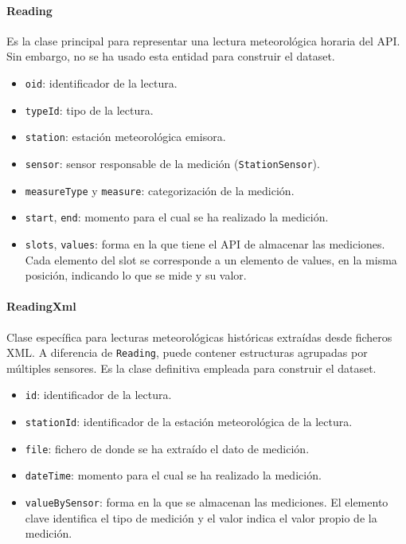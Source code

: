 \vspace{1em}
\paragraph{Reading}
Es la clase principal para representar una lectura meteorológica horaria del API. Sin embargo, no se ha usado esta entidad para construir el dataset.
\begin{itemize}
	\item \texttt{oid}: identificador de la lectura.
	\item \texttt{typeId}: tipo de la lectura.
	\item \texttt{station}: estación meteorológica emisora.
	\item \texttt{sensor}: sensor responsable de la medición (\texttt{StationSensor}).
	\item \texttt{measureType} y \texttt{measure}: categorización de la medición.
	\item \texttt{start}, \texttt{end}: momento para el cual se ha realizado la medición.
	\item \texttt{slots}, \texttt{values}: forma en la que tiene el API de almacenar las mediciones. Cada elemento del slot se corresponde a un elemento de values, en la misma posición, indicando lo que se mide y su valor.
\end{itemize}

\paragraph{ReadingXml}
Clase específica para lecturas meteorológicas históricas extraídas desde ficheros XML. A diferencia de \texttt{Reading}, puede contener estructuras agrupadas por múltiples sensores. Es la clase definitiva empleada para construir el dataset.
\begin{itemize}
	\item \texttt{id}: identificador de la lectura.
	\item \texttt{stationId}: identificador de la estación meteorológica de la lectura.
	\item \texttt{file}: fichero de donde se ha extraído el dato de medición.
	\item \texttt{dateTime}: momento para el cual se ha realizado la medición.
	\item \texttt{valueBySensor}: forma en la que se almacenan las mediciones. El elemento clave identifica el tipo de medición y el valor indica el valor propio de la medición.
\end{itemize}

